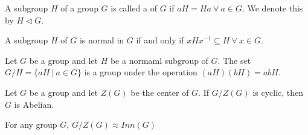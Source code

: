 \documentclass[12pt]{scrartcl}
\begin{document}
\begin{definition}
  A subgroup $H$ of a group $G$ is called a  of $G$ if $aH = Ha \ \forall \ a \in G$. We denote this 
  by $H \lhd G$. 
\end{definition}

\begin{theorem}
  A subgroup $H$ of $G$ is normal in $G$ if and only if $xHx^{-1} \subseteq H \ \forall \ x \in G$. 
\end{theorem}

\begin{theorem}
  Let $G$ be a group and let $H$ be a normaml subgroup of $G$. The set $G \slash H = \{aH \ | \ a \in G\}$ is a group 
  under the operation $(aH)(bH) = abH$.
\end{theorem}

\begin{theorem}
  Let $G$ be a group and let $Z(G)$ be the center of $G$. If $G \slash Z(G)$ is cyclic, then $G$ is Abelian.
\end{theorem}

\begin{theorem}
  For any group $G$, $G \slash Z(G) \approx Inn(G)$
\end{theorem}

\begin{theorem}
  
\end{theorem}
\end{document}
